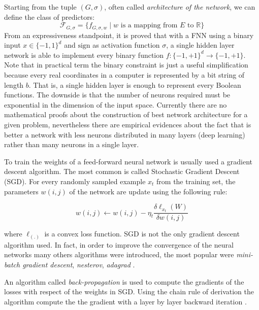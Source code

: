 Starting from the tuple $(G, \sigma)$, often called \emph{architecture of the network}, we can define the class of predictors: 
\[ \mathcal{F}_{G, \sigma} = \{ f_{G, \sigma, w} \mid w \textrm{ is a mapping from } E \textrm{ to } \mathbb R \} \]
From an expressiveness standpoint, it is proved that with a FNN using a binary input $x \in \{-1, 1\}^d$ and $\mathrm{sign}$ as activation
function $\sigma$, a single hidden layer network is able to
implement every binary function $f: \{-1, +1\}^d \to \{-1, +1\}$. Note that in
practical term the binary constraint is just a useful simplification because every real coordinates in a computer is represented
by a bit string of length $b$. That is, a single hidden layer is
enough to represent every Boolean functions. The downside is that
the number of neurons required must be exponential in the dimension
of the input space. Currently there are no mathematical proofs about the construction of
best network architecture for a given problem, nevertheless there are empirical evidences
about the fact that is better a network with less neurons distributed in many layers (deep
learning) rather than many neurons in a single layer. %

To train the weights of a feed-forward neural network is usually
used a gradient descent algorithm. The most common is called
Stochastic Gradient Descent (SGD). For every randomly sampled
example $x_t$ from the training set, the parameters $w(i, j)$ of the
network are update using the following rule:

\begin{equation} \label{eq:sgd} 
w(i, j) \leftarrow w(i, j) -  \eta_t \frac{\delta\ell_{x_t}(W)}{\delta w(i, j )}
\end{equation}

where $\ell_(.)$ is a convex loss function. SGD is not the only
gradient descent algorithm used. In fact, in order to
improve the convergence of the neural networks many others algorithms were introduced,
the most popular were \emph{mini-batch gradient descent}, \emph{nesterov}, \emph{adagrad}
\cite{RuderGDOpt}. 

An algorithm called \emph{back-propagation} is used to compute the
gradients of the losses with respect of the weights in SGD. Using the chain rule of derivation the algorithm compute the the gradient with a layer by layer backward iteration
\cite{HintonBackProp}.
 

